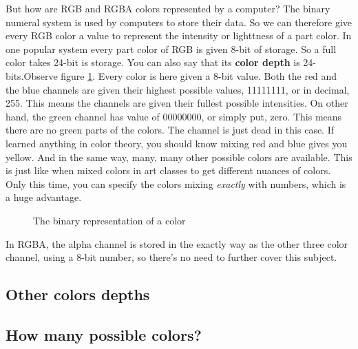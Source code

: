 But how are RGB and RGBA colors represented by a computer? The binary
numeral system is used by computers to store their data. So we can
therefore give every RGB color a value to represent the intensity or
lighttness of a part color. In one popular system every part color of
RGB is given 8-bit of storage. So a full color takes 24-bit is
storage. You can also say that its \textbf{color depth}
 is 24-bits.Observe figure \ref{fig:rgb-bits}. Every color is
here given a 8-bit value. Both the red and the blue channels are given
their highest possible values, 11111111, or in decimal, 255. This
means the channels are given their fullest possible intensities. On
other hand, the green channel has value of 00000000, or simply put,
zero. This means there are no green parts of the colors. The channel
is just dead in this case. If learned anything in color theory, you
should know mixing red and blue gives you yellow. And in the same way,
many, many other possible colors are available. This is just like when
mixed colors in art classes to get different nuances of colors. Only
this time, you can specify the colors mixing \emph{exactly} with
numbers, which is a huge advantage.


\begin{figure}[h]
  \centering
  \newcommand{\bitbox}[3]{
    \filldraw[fill=#2!80!white,draw=black] (#1,0) +(-.2,-.2) rectangle ++(.2,.2);
    \draw (#1,0) node{#3};
  }
  \caption{The binary representation of a color}
  \label{fig:rgb-bits}
\end{figure}


In RGBA, the alpha channel is stored in the exactly way as the other
three color channel, using a 8-bit number, so there's no need to
further cover this subject.

\subsection{Other colors depths}
\label{sec:other-colors-depths}

\subsection{How many possible colors?}
\label{sec:how-many-possible-colors}

